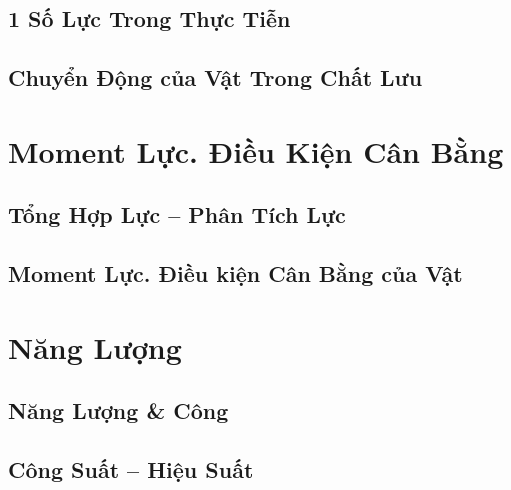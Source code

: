 \documentclass{article}
\numberwithin{equation}{section}
\begin{document}
\subsection{1 Số Lực Trong Thực Tiễn}


\subsection{Chuyển Động của Vật Trong Chất Lưu}


\section{Moment Lực. Điều Kiện Cân Bằng}

\subsection{Tổng Hợp Lực -- Phân Tích Lực}


\subsection{Moment Lực. Điều kiện Cân Bằng của Vật}


\section{Năng Lượng}

\subsection{Năng Lượng \& Công}


\subsection{Công Suất -- Hiệu Suất}

\end{document}

